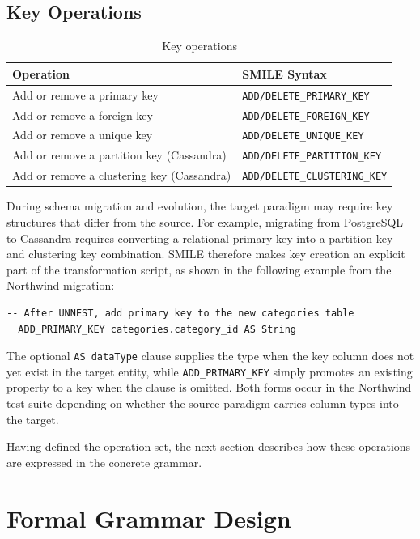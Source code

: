 \subsection{Key Operations}\label{subsec:op-keys} %
\begin{table}[h]
  \centering
  \small
  \begin{tabular}{ll}
  \toprule
  \textbf{Operation} & \textbf{SMILE Syntax} \\
  \midrule
  Add or remove a primary key                & \texttt{ADD/DELETE\_PRIMARY\_KEY}    \\
  Add or remove a foreign key                & \texttt{ADD/DELETE\_FOREIGN\_KEY}    \\
  Add or remove a unique key                 & \texttt{ADD/DELETE\_UNIQUE\_KEY}     \\
  Add or remove a partition key (Cassandra)  & \texttt{ADD/DELETE\_PARTITION\_KEY}  \\
  Add or remove a clustering key (Cassandra) & \texttt{ADD/DELETE\_CLUSTERING\_KEY} \\
  \bottomrule
  \end{tabular}
  \caption{Key operations}
  \label{tab:ops-key}
\end{table}
  During schema migration and evolution, the target paradigm may require key structures that differ from the source. For example, migrating from PostgreSQL to Cassandra requires converting a relational primary key into a partition key and clustering key combination. SMILE therefore makes key creation an explicit part of the transformation script, as shown in the following example from the Northwind migration:
  \begin{lstlisting}[basicstyle=\small\ttfamily]
  -- After UNNEST, add primary key to the new categories table
  ADD_PRIMARY_KEY categories.category_id AS String
  \end{lstlisting}

The optional \texttt{AS dataType} clause supplies the type when the key column does not yet exist in the target entity, while \texttt{ADD\_PRIMARY\_KEY} simply promotes an existing property to a key when the clause is omitted. Both forms occur in the Northwind test suite depending on whether the source paradigm carries column types into the target.

Having defined the operation set, the next section describes how these operations are expressed in the concrete grammar.
\section{Formal Grammar Design}\label{sec:grammar-design}
